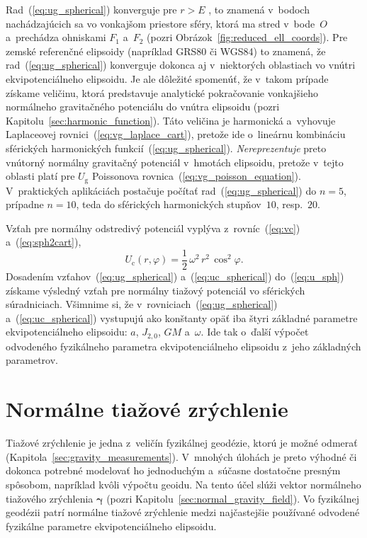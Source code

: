 \documentclass[a4paper,12pt]{book}
\newcommand{\gidx}{\mathrm g}
\newcommand{\cidx}{\mathrm c}
\begin{document}
Rad~(\ref{eq:ug_spherical}) konverguje pre $r > E$ 
\parencite{MoritzAdvancedGeodesy}, to znamená v~bodoch nachádzajúcich sa vo 
vonkajšom priestore sféry, ktorá ma stred v~bode~$O$ a~prechádza ohniskami 
$F_1$ a~$F_2$ (pozri Obrázok~\ref{fig:reduced_ell_coords}).  Pre zemské 
referenčné elipsoidy (napríklad GRS80 či WGS84) to znamená, že 
rad~(\ref{eq:ug_spherical}) konverguje dokonca aj v~niektorých oblastiach vo 
vnútri ekvipotenciálneho elipsoidu.  Je ale dôležité spomenúť, že v~takom 
prípade získame veličinu, ktorá predstavuje analytické pokračovanie vonkajšieho 
normálneho gravitačného potenciálu do vnútra elipsoidu (pozri 
Kapitolu~\ref{sec:harmonic_function}).  Táto veličina je harmonická a~vyhovuje 
Laplaceovej rovnici~(\ref{eq:vg_laplace_cart}), pretože ide o~lineárnu 
kombináciu sférických harmonických funkcií~(\ref{eq:ug_spherical}).  
\emph{Nereprezentuje} preto vnútorný normálny gravitačný potenciál v~hmotách 
elipsoidu, pretože v~tejto oblasti platí pre $U_\gidx$ Poissonova 
rovnica~(\ref{eq:vg_poisson_equation}).  V~praktických aplikáciách postačuje 
počítať rad~(\ref{eq:ug_spherical}) do $n = 5$, prípadne $n = 10$, teda do 
sférických harmonických stupňov~$10$, resp.~$20$.

Vzťah pre normálny odstredivý potenciál vyplýva z~rovníc~(\ref{eq:vc}) 
a~(\ref{eq:sph2cart}),
%
\begin{equation}
\label{eq:uc_spherical}
U_\cidx(r, \varphi) = \frac{1}{2} \, \omega^2 \, r^2 \, \cos^2\varphi{.}
\end{equation}
%
Dosadením vzťahov~(\ref{eq:ug_spherical}) a~(\ref{eq:uc_spherical}) 
do~(\ref{eq:u_sph}) získame výsledný vzťah pre normálny tiažový potenciál vo 
sférických súradniciach.  Všimnime si, že v~rovniciach~(\ref{eq:ug_spherical}) 
a~(\ref{eq:uc_spherical}) vystupujú ako konštanty opäť iba štyri základné 
parametre ekvipotenciálneho elipsoidu: $a$, $J_{2,0}$, $GM$ a~$\omega$.  Ide 
tak o~ďalší výpočet odvodeného fyzikálneho parametra ekvipotenciálneho 
elipsoidu z~jeho základných parametrov.



\section{Normálne tiažové zrýchlenie}
\label{sec:normal_gravity}

Tiažové zrýchlenie je jedna z~veličín fyzikálnej geodézie, ktorú je možné 
odmerať (Kapitola~\ref{sec:gravity_measurements}).  V~mnohých úlohách je preto 
výhodné či dokonca potrebné modelovať ho jednoduchým a~súčasne dostatočne 
presným spôsobom, napríklad kvôli výpočtu geoidu.  Na tento účel slúži vektor 
normálneho tiažového zrýchlenia $\boldsymbol\gamma$ (pozri 
Kapitolu~\ref{sec:normal_gravity_field}).  Vo fyzikálnej geodézii patrí 
normálne tiažové zrýchlenie medzi najčastejšie používané odvodené fyzikálne 
parametre ekvipotenciálneho elipsoidu.
\end{document}
